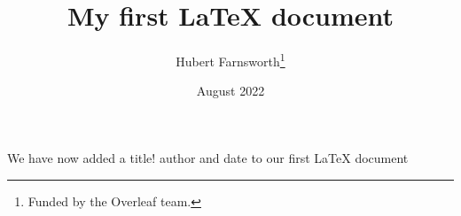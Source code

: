 \documentclass[12pt, letterpaper]{article}
\title{My first LaTeX document}
\author{Hubert Farnsworth\thanks{Funded by the Overleaf team.}}
\date{August 2022}
\begin{document}
\maketitle
We have now added a title! author and date to our first \LaTeX{} document
\end{document}
